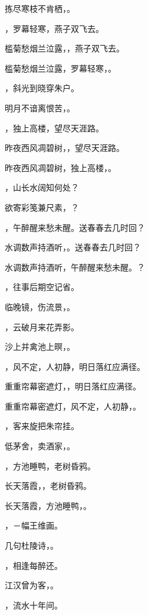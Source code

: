 \documentclass[12pt, a4paper, addpoints, answers]{exam}
\begin{document}
\begin{questions}
\question[3] 拣尽寒枝不肯栖，\fillin 。

\question[3] \fillin ，罗幕轻寒，燕子双飞去。

\question[3] 槛菊愁烟兰泣露，\fillin ，燕子双飞去。

\question[3] 槛菊愁烟兰泣露，罗幕轻寒，\fillin 。

\question[3] \fillin ，斜光到晓穿朱户。

\question[3] 明月不谙离恨苦，\fillin 。

\question[3] \fillin ，独上高楼，望尽天涯路。

\question[3] 昨夜西风凋碧树，\fillin ，望尽天涯路。

\question[3] 昨夜西风凋碧树，独上高楼，\fillin 。

\question[3] \fillin ，山长水阔知何处？

\question[3] 欲寄彩笺兼尺素，\fillin ？

\question[3] \fillin ，午醉醒来愁未醒。送春春去几时回？

\question[3] 水调数声持酒听，\fillin 。送春春去几时回？

\question[3] 水调数声持酒听，午醉醒来愁未醒。\fillin ？

\question[3] \fillin ，往事后期空记省。

\question[3] 临晚镜，伤流景，\fillin 。

\question[3] \fillin ，云破月来花弄影。

\question[3] 沙上并禽池上暝，\fillin 。

\question[3] \fillin ，风不定，人初静，明日落红应满径。

\question[3] 重重帘幕密遮灯，\fillin ，明日落红应满径。

\question[3] 重重帘幕密遮灯，风不定，人初静，\fillin 。

\question[3] \fillin ，客来旋把朱帘挂。

\question[3] 低茅舍，卖酒家，\fillin 。

\question[3] \fillin ，方池睡鸭，老树昏鸦。

\question[3] 长天落霞，\fillin ，老树昏鸦。

\question[3] 长天落霞，方池睡鸭，\fillin 。

\question[3] \fillin ，－幅王维画。

\question[3] 几句杜陵诗，\fillin 。

\question[3] \fillin ，相逢每醉还。

\question[3] 江汉曾为客，\fillin 。

\question[3] \fillin ，流水十年间。


\end{questions}
\end{document}
